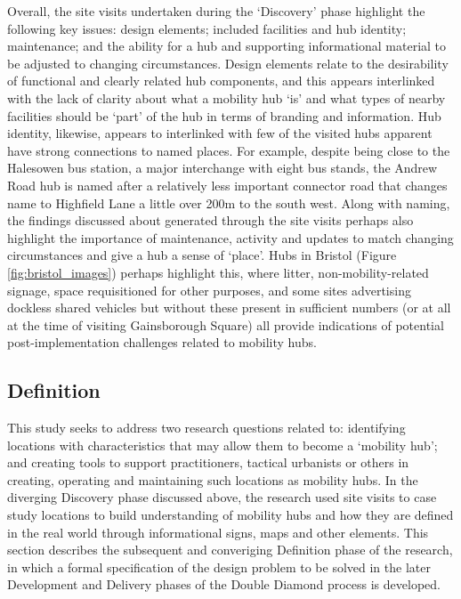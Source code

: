 \documentclass[preprint, 3p,
authoryear]{elsarticle} %
\begin{document}
Overall, the site visits undertaken during the `Discovery' phase
highlight the following key issues: design elements; included facilities
and hub identity; maintenance; and the ability for a hub and supporting
informational material to be adjusted to changing circumstances. Design
elements relate to the desirability of functional and clearly related
hub components, and this appears interlinked with the lack of clarity
about what a mobility hub `is' and what types of nearby facilities
should be `part' of the hub in terms of branding and information. Hub
identity, likewise, appears to interlinked with few of the visited hubs
apparent have strong connections to named places. For example, despite
being close to the Halesowen bus station, a major interchange with eight
bus stands, the Andrew Road hub is named after a relatively less
important connector road that changes name to Highfield Lane a little
over 200m to the south west. Along with naming, the findings discussed
about generated through the site visits perhaps also highlight the
importance of maintenance, activity and updates to match changing
circumstances and give a hub a sense of `place'. Hubs in Bristol (Figure
\ref{fig:bristol_images}) perhaps highlight this, where litter,
non-mobility-related signage, space requisitioned for other purposes,
and some sites advertising dockless shared vehicles but without these
present in sufficient numbers (or at all at the time of visiting
Gainsborough Square) all provide indications of potential
post-implementation challenges related to mobility hubs.

\subsection{Definition}\label{definition}

This study seeks to address two research questions related to:
identifying locations with characteristics that may allow them to become
a `mobility hub'; and creating tools to support practitioners, tactical
urbanists or others in creating, operating and maintaining such
locations as mobility hubs. In the diverging Discovery phase discussed
above, the research used site visits to case study locations to build
understanding of mobility hubs and how they are defined in the real
world through informational signs, maps and other elements. This section
describes the subsequent and converiging Definition phase of the
research, in which a formal specification of the design problem to be
solved in the later Development and Delivery phases of the Double
Diamond process is developed.
\end{document}
